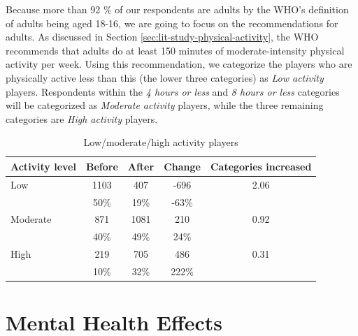 Because more than 92 \% of our respondents are adults by the WHO's definition of adults being aged 18-16, we are going to focus on the recommendations for adults. As discussed in Section \ref{sec:lit-study-physical-activity}, the WHO recommends that adults do at least 150 minutes of moderate-intensity physical activity per week. Using this recommendation, we categorize the players who are physically active less than this (the lower three categories) as \emph{Low activity} players. Respondents within the \emph{4 hours or less} and \emph{8 hours or less} categories will be categorized as \emph{Moderate activity} players, while the three remaining categories are \emph{High activity} players.

\begin{table}
	\centering
	\caption{Low/moderate/high activity players}
	\label{tbl:physical-activity-low-moderate-high}
	\begin{tabular}{|l|c|c|c|c|}
		\hline
		\textbf{Activity level}	& \textbf{Before}	& \textbf{After}	& \textbf{Change}	& \textbf{Categories increased}\\
		\hline\hline
		Low		& 1103	& 407	& -696	& 2.06\\
				& 50\%	& 19\%	& -63\%	&\\\hline
		Moderate& 871	& 1081	& 210	& 0.92\\
				& 40\%	& 49\%	& 24\%	&\\\hline
		High	& 219	& 705	& 486	& 0.31\\
				& 10\%	& 32\%	& 222\%	&\\\hline
	\end{tabular}
\end{table}





\chapter{Mental Health Effects}
\label{chapter:player-study-mental}

